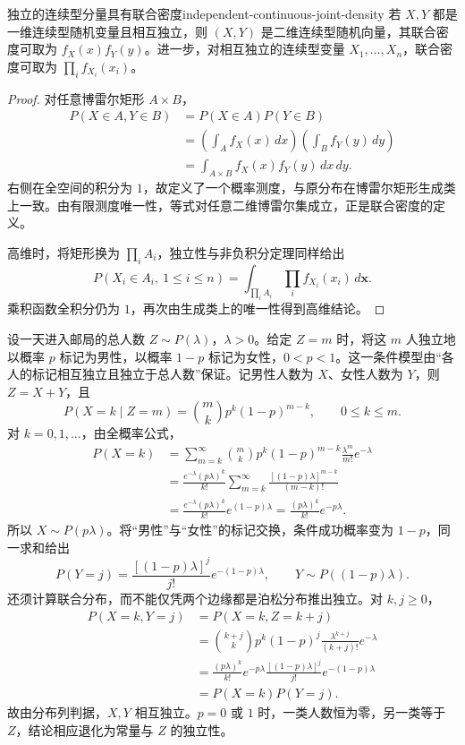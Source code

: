 \begin{mycorollary}{独立的连续型分量具有联合密度}{independent-continuous-joint-density}
若 $X,Y$ 都是一维连续型随机变量且相互独立，则 $(X,Y)$ 是二维连续型随机向量，其联合密度可取为 $f_X(x)f_Y(y)$。进一步，对相互独立的连续型变量 $X_1,\ldots,X_n$，联合密度可取为 $\prod_i f_{X_i}(x_i)$。
\end{mycorollary}
\begin{proof}
对任意博雷尔矩形 $A\times B$，
\begin{align*}
P(X\in A,Y\in B)
&=P(X\in A)P(Y\in B)\\
&=\left(\int_Af_X(x)\,dx\right)\left(\int_Bf_Y(y)\,dy\right)\\
&=\int_{A\times B}f_X(x)f_Y(y)\,dx\,dy.
\end{align*}
右侧在全空间的积分为 $1$，故定义了一个概率测度，与原分布在博雷尔矩形生成类上一致。由有限测度唯一性，等式对任意二维博雷尔集成立，正是联合密度的定义。

高维时，将矩形换为 $\prod_iA_i$，独立性与非负积分定理同样给出
\[
P(X_i\in A_i,\ 1\leq i\leq n)
=\int_{\prod_iA_i}\prod_i f_{X_i}(x_i)\,d\boldsymbol x.
\]
乘积函数全积分仍为 $1$，再次由生成类上的唯一性得到高维结论。
\end{proof}

\begin{example}[泊松总人数的随机分流]
设一天进入邮局的总人数 $Z\sim P(\lambda)$，$\lambda>0$。给定 $Z=m$ 时，将这 $m$ 人独立地以概率 $p$ 标记为男性，以概率 $1-p$ 标记为女性，$0<p<1$。这一条件模型由“各人的标记相互独立且独立于总人数”保证。记男性人数为 $X$、女性人数为 $Y$，则 $Z=X+Y$，且
\[
P(X=k\mid Z=m)=\binom mkp^k(1-p)^{m-k},\qquad 0\leq k\leq m.
\]
对 $k=0,1,\ldots$，由全概率公式，
\begin{align*}
P(X=k)
&=\sum_{m=k}^{\infty}\binom mkp^k(1-p)^{m-k}
 \frac{\lambda^m}{m!}e^{-\lambda}\\
&=\frac{e^{-\lambda}(p\lambda)^k}{k!}
 \sum_{m=k}^{\infty}\frac{[(1-p)\lambda]^{m-k}}{(m-k)!}\\
&=\frac{e^{-\lambda}(p\lambda)^k}{k!}e^{(1-p)\lambda}
=\frac{(p\lambda)^k}{k!}e^{-p\lambda}.
\end{align*}
所以 $X\sim P(p\lambda)$。将“男性”与“女性”的标记交换，条件成功概率变为 $1-p$，同一求和给出
\[
P(Y=j)=\frac{[(1-p)\lambda]^j}{j!}e^{-(1-p)\lambda},
\qquad Y\sim P((1-p)\lambda).
\]
还须计算联合分布，而不能仅凭两个边缘都是泊松分布推出独立。对 $k,j\geq0$，
\begin{align*}
P(X=k,Y=j)
&=P(X=k,Z=k+j)\\
&=\binom{k+j}{k}p^k(1-p)^j
  \frac{\lambda^{k+j}}{(k+j)!}e^{-\lambda}\\
&=\frac{(p\lambda)^k}{k!}e^{-p\lambda}
  \frac{[(1-p)\lambda]^j}{j!}e^{-(1-p)\lambda}\\
&=P(X=k)P(Y=j).
\end{align*}
故由分布列判据，$X,Y$ 相互独立。$p=0$ 或 $1$ 时，一类人数恒为零，另一类等于 $Z$，结论相应退化为常量与 $Z$ 的独立性。
\end{example}

